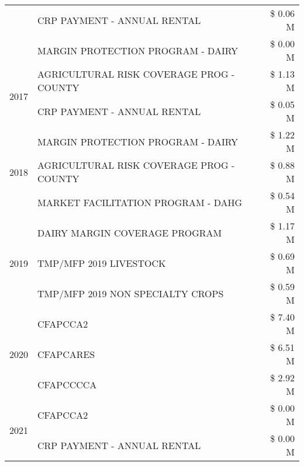 \begin{tabular}{llr}
 & CRP PAYMENT - ANNUAL RENTAL & \$ 0.06 M \\
 & MARGIN PROTECTION PROGRAM - DAIRY & \$ 0.00 M \\
\cline{1-3}
\multirow[t]{2}{*}{2017} & AGRICULTURAL RISK COVERAGE PROG - COUNTY & \$ 1.13 M \\
 & CRP PAYMENT - ANNUAL RENTAL & \$ 0.05 M \\
\cline{1-3}
\multirow[t]{3}{*}{2018} & MARGIN PROTECTION PROGRAM - DAIRY & \$ 1.22 M \\
 & AGRICULTURAL RISK COVERAGE PROG - COUNTY & \$ 0.88 M \\
 & MARKET FACILITATION PROGRAM - DAHG & \$ 0.54 M \\
\cline{1-3}
\multirow[t]{3}{*}{2019} & DAIRY MARGIN COVERAGE PROGRAM & \$ 1.17 M \\
 & TMP/MFP 2019 LIVESTOCK & \$ 0.69 M \\
 & TMP/MFP 2019 NON SPECIALTY CROPS & \$ 0.59 M \\
\cline{1-3}
\multirow[t]{3}{*}{2020} & CFAPCCA2 & \$ 7.40 M \\
 & CFAPCARES & \$ 6.51 M \\
 & CFAPCCCCA & \$ 2.92 M \\
\cline{1-3}
\multirow[t]{2}{*}{2021} & CFAPCCA2 & \$ 0.00 M \\
 & CRP PAYMENT - ANNUAL RENTAL & \$ 0.00 M \\
\cline{1-3}
\bottomrule
\end{tabular}
